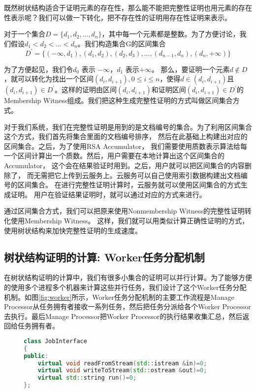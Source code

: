 既然树状结构适合于证明元素的存在性，那么能不能把完整性证明也用元素的存在性表示呢？我们可以做一下转化，把不存在性的证明用存在性证明来表示。

对于一个集合$D = \{d_1, d_2, ..., d_n\}$，其中每一个元素都是整数。为了方便讨论，我们假设$d_1 < d_2 < ... < d_n$。我们构造集合G的区间集合
\begin{equation} D^\prime = \{(-\infty, d_1), (d_1, d_2), (d_2, d_3), ... ,(d_{n-1}, d_n), (d_n, +\infty)\}\end{equation}

为了方便起见，我们令$d_0$ 表示 $-\infty$，$d_1$ 表示$+\infty$。
那么，要证明一个元素$d \notin D$，就可以转化为找出一个区间$(d_i, d_{i+1}), 0 \le i \le n$，使得$d \in (d_i, d_{i+1})$且$(d_i, d_{i+1}) \in D^\prime$。这样的证明由区间$(d_i, d_{i+1})$和证明区间$(d_i, d_{i+1}) \in D^\prime$的Membership Witness组成。我们把这种生成完整性证明的方式叫做区间集合方式。

对于我们系统，我们在完整性证明是用到的是文档编号的集合。为了利用区间集合这个方式，我们首先将集合里面的文档编号排序，
然后在此基础上构建出对应的区间集合。之后，为了使用RSA Accumulator，
我们需要使用质数表示算法给每一个区间计算出一个质数。然后，用户需要在本地计算出这个区间集合的Accumulator，
这个会在结果验证时用到。之后，用户就可以把区间集合的内容删除了，
而无需把它上传到云服务上。云服务可以自己使用索引数据构建出文档编号的区间集合。
在进行完整性证明计算时，云服务就可以使用区间集合的方式生成证明。
用户在验证结果证明时，就可以通过对应的方式来进行。

通过区间集合方式，我们可以把原来使用Nonmembership Witness的完整性证明转化使用Membership Witness。
这样，我们就可以用类似计算正确性证明的方式，使用树状结构来加快完整性证明的生成速度。


\subsection{树状结构证明的计算: Worker任务分配机制}
在树状结构证明的计算中，我们有很多小集合的证明可以并行计算。为了能够方便的使用多个进程多个机器来计算这些并行任务，我们设计了这个Worker任务分配机制。如图\ref{fig:worker}所示，Worker任务分配机制的主要工作流程是Manage Processor从任务拥有者接收一系列任务，然后把任务分派给各个Worker Processor去执行。最后Manage Processor把Worker Processor的执行结果收集汇总，然后返回给任务拥有者。

\begin{figure}[htb]
\begin{lstlisting}[language=C++] 
class JobInterface
{
public:
    virtual void readFromStream(std::istream &in)=0;
    virtual void writeToStream(std::ostream &out)=0;
    virtual std::string run()=0;
};
\end{lstlisting}
\end{figure}


